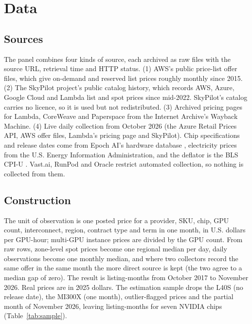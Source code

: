 \section{Data}
\label{sec:data}

\subsection{Sources}

The panel combines four kinds of source, each archived as raw files with the source URL,
retrieval time and HTTP status. (1) AWS's public price-list offer files, which give on-demand and
reserved list prices roughly monthly since 2015. (2) The SkyPilot project's public catalog history,
which records AWS, Azure, Google Cloud and Lambda list and spot prices since mid-2022. SkyPilot's
catalog carries no licence, so it is used but not redistributed. (3) Archived pricing pages for
Lambda, CoreWeave and Paperspace from the Internet Archive's Wayback Machine. (4) Live daily
collection from October 2026 (the Azure Retail Prices API, AWS offer files, Lambda's pricing page
and SkyPilot). Chip specifications and release dates come from Epoch AI's hardware database
\citep{epoch2026hardware}, electricity prices from the U.S. Energy Information Administration,
and the deflator is the BLS CPI-U \citep{blscpiu}. Vast.ai, RunPod and Oracle restrict automated
collection, so nothing is collected from them.

\subsection{Construction}

The unit of observation is one posted price for a provider, SKU, chip, GPU count, interconnect,
region, contract type and term in one month, in U.S. dollars per GPU-hour; multi-GPU instance
prices are divided by the GPU count. From \nRawRows{} raw rows, zone-level spot prices become one
regional median per day, daily observations become one monthly median, and where two collectors
record the same offer in the same month the more direct source is kept (the two agree to a median
gap of zero). The result is \nPanelRows{} listing-months from October 2017 to November 2026. Real
prices are in 2025 dollars. The estimation sample drops the L40S (no release date), the MI300X (one
month), outlier-flagged prices and the partial month of November 2026, leaving \nSampleRows{}
listing-months for seven NVIDIA chips (Table~\ref{tab:sample}).

